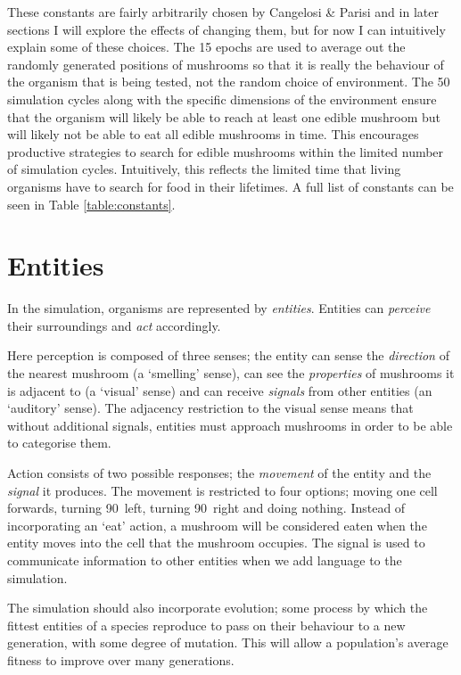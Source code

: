 \documentclass[12pt,a4paper,twoside,openright]{report}
\begin{document}
These constants are fairly arbitrarily chosen by Cangelosi \& Parisi and in later sections I will explore the effects of changing them, but for now I can intuitively explain some of these choices. The 15 epochs are used to average out the randomly generated positions of mushrooms so that it is really the behaviour of the organism that is being tested, not the random choice of environment. The 50 simulation cycles along with the specific dimensions of the environment ensure that the organism will likely be able to reach at least one edible mushroom but will likely not be able to eat all edible mushrooms in time. This encourages productive strategies to search for edible mushrooms within the limited number of simulation cycles. Intuitively, this reflects the limited time that living organisms have to search for food in their lifetimes. A full list of constants can be seen in Table \ref{table:constants}.

\section{Entities}\label{section:entities}

In the simulation, organisms are represented by \emph{entities}. Entities can \emph{perceive} their surroundings and \emph{act} accordingly.

Here perception is composed of three senses; the entity can sense the \emph{direction} of the nearest mushroom (a `smelling' sense), can see the \emph{properties} of mushrooms it is adjacent to (a `visual' sense) and can receive \emph{signals} from other entities (an `auditory' sense). The adjacency restriction to the visual sense means that without additional signals, entities must approach mushrooms in order to be able to categorise them.

Action consists of two possible responses; the \emph{movement} of the entity and the \emph{signal} it produces. The movement is restricted to four options; moving one cell forwards, turning 90\textdegree~left, turning 90\textdegree~right and doing nothing. Instead of incorporating an `eat' action, a mushroom will be considered eaten when the entity moves into the cell that the mushroom occupies. The signal is used to communicate information to other entities when we add language to the simulation.

The simulation should also incorporate evolution; some process by which the fittest entities of a species reproduce to pass on their behaviour to a new generation, with some degree of mutation. This will allow a population's average fitness to improve over many generations.
\end{document}
